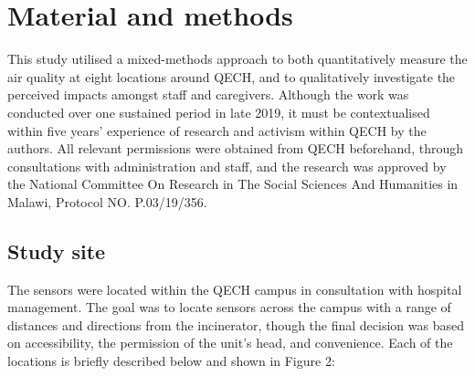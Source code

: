 \documentclass[
  authoryear,
  review,
  3p]{elsarticle}
\begin{document}
\hypertarget{material-and-methods}{%
\section{Material and methods}\label{material-and-methods}}

This study utilised a mixed-methods approach to both quantitatively
measure the air quality at eight locations around QECH, and to
qualitatively investigate the perceived impacts amongst staff and
caregivers. Although the work was conducted over one sustained period in
late 2019, it must be contextualised within five years' experience of
research and activism within QECH by the authors. All relevant
permissions were obtained from QECH beforehand, through consultations
with administration and staff, and the research was approved by the
National Committee On Research in The Social Sciences And Humanities in
Malawi, Protocol NO. P.03/19/356.

\hypertarget{study-site}{%
\subsection{Study site}\label{study-site}}

The sensors were located within the QECH campus in consultation with
hospital management. The goal was to locate sensors across the campus
with a range of distances and directions from the incinerator, though
the final decision was based on accessibility, the permission of the
unit's head, and convenience. Each of the locations is briefly described
below and shown in Figure 2:
\end{document}
